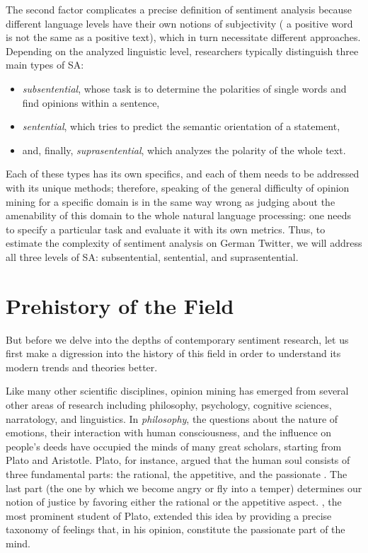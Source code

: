 The second factor complicates a precise definition of sentiment
analysis because different language levels have their own notions of
subjectivity (\eg{} a positive word is not the same as a positive
text), which in turn necessitate different approaches.  Depending on
the analyzed linguistic level, researchers typically distinguish three
main types of SA:
\begin{itemize}
  \item\emph{subsentential}, whose task is to determine the polarities
    of single words and find opinions within a sentence,
  \item\emph{sentential}, which tries to predict the semantic
    orientation of a statement,
  \item and, finally, \emph{suprasentential}, which analyzes the
    polarity of the whole text.
\end{itemize}
Each of these types has its own specifics, and each of them needs to
be addressed with its unique methods; therefore, speaking of the
general difficulty of opinion mining for a specific domain is in the
same way wrong as judging about the amenability of this domain to the
whole natural language processing: one needs to specify a particular
task and evaluate it with its own metrics.  Thus, to estimate the
complexity of sentiment analysis on German Twitter, we will address
all three levels of SA: subsentential, sentential, and
suprasentential.

\section{Prehistory of the Field}

But before we delve into the depths of contemporary sentiment
research, let us first make a digression into the history of this
field in order to understand its modern trends and theories better.

Like many other scientific disciplines, opinion mining has emerged
from several other areas of research including philosophy, psychology,
cognitive sciences, narratology, and linguistics.  In
\emph{philosophy}, the questions about the nature of emotions, their
interaction with human consciousness, and the influence on people's
deeds have occupied the minds of many great scholars, starting from
Plato and Aristotle.  Plato, for instance, argued that the human soul
consists of three fundamental parts: the rational, the appetitive, and
the passionate \citep[see][Book~IV]{Plato:91}.  The last part (the one
by which we become angry or fly into a temper) determines our notion
of justice by favoring either the rational or the appetitive aspect.
\citet{Aristotle:54}, the most prominent student of Plato, extended
this idea by providing a precise taxonomy of feelings that, in his
opinion, constitute the passionate part of the mind.

